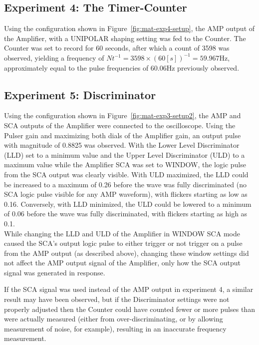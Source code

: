 \documentclass[12pt]{article}
\begin{document}
\subsection{Experiment 4: The Timer-Counter}
Using the configuration shown in Figure~\ref{fig:mat-exp4-setup}, the AMP output of the Amplifier, with a UNIPOLAR shaping setting was fed to the Counter.
The Counter was set to record for 60 seconds, after which a count of 3598 was observed, yielding a frequency of $Nt^{-1}=3598\times(60[s])^{-1}=59.967$Hz, approximately equal to the pulse frequencies of 60.06Hz previously observed.
\subsection{Experiment 5: Discriminator}
Using the configuration shown in Figure~\ref{fig:mat-exp3-setup2},
the AMP and SCA outputs of the Amplifier were connected to the oscilloscope.
Using the Pulser gain and maximizing both dials of the Amplifier gain, an output pulse with magnitude of 0.8825 was observed.
With the Lower Level Discriminator (LLD) set to a minimum value and the Upper Level Discriminator (ULD) to a maximum value while the Amplifier SCA was set to WINDOW, the logic pulse from the SCA output was clearly visible.
With ULD maximized, the LLD could be increased to a maximum of 0.26 before the wave was fully discriminated (no SCA logic pulse visible for any AMP waveform), with flickers starting as low as 0.16. 
Conversely, with LLD minimized, the ULD could be lowered to a minimum of 0.06 before the wave was fully discriminated, with flickers starting as high as 0.1.
\\

While changing the LLD and ULD of the Amplifier in WINDOW SCA mode caused the SCA's output logic pulse to either trigger or not trigger on a pulse from the AMP output (as described above), changing these window settings did not affect the AMP output signal of the Amplifier, only how the SCA output signal was generated in response.

If the SCA signal was used instead of the AMP output in experiment 4, a similar result may have been observed, but if the Discriminator settings were not properly adjusted then the Counter could have counted fewer or more pulses than were actually measured (either from over-discriminating, or by allowing measurement of noise, for example), resulting in an inaccurate frequency measurement.
\end{document}
